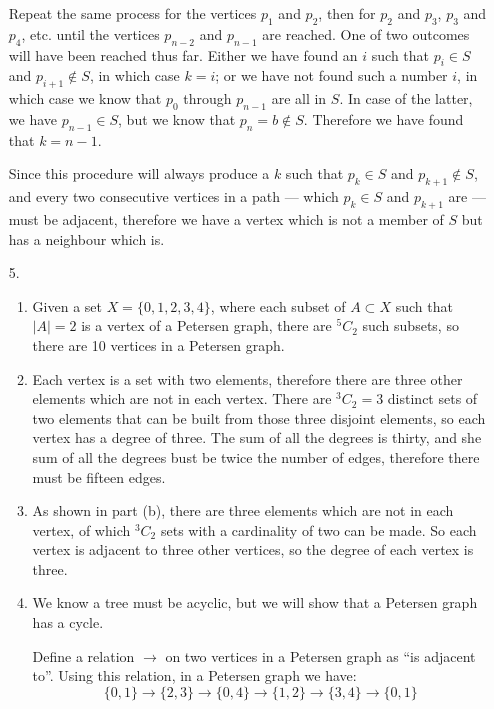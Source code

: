 \documentclass[fleqn]{article}
\newcommand*{\comb}[2]{{}^{#1}C_{#2}}
\begin{document}
\begin{enumerate}
	Repeat the same process for the vertices \(p_1\) and \(p_2\), then for \(p_2\) and \(p_3\), \(p_3\) and \(p_4\), etc. until the vertices \(p_{n-2}\) and \(p_{n-1}\) are reached. One of two outcomes will have been reached thus far. Either we have found an \(i\) such that \(p_i \in S\) and \(p_{i+1} \notin S\), in which case \(k = i\); or we have not found such a number \(i\), in which case we know that \(p_0\) through \(p_{n-1}\) are all in \(S\). In case of the latter, we have \(p_{n-1} \in S\), but we know that \(p_n = b \notin S\). Therefore we have found that \(k = n - 1\).

	Since this procedure will always produce a \(k\) such that \(p_k \in S\) and \(p_{k+1} \notin S\), and every two consecutive vertices in a path --- which \(p_k \in S\) and \(p_{k+1}\) are --- must be adjacent, therefore we have a vertex which is not a member of \(S\) but has a neighbour which is.

	\bigskip
	\item[5.]
	\begin{enumerate}
		\item %
		Given a set \(X = \{0, 1, 2, 3, 4\}\), where each subset of \(A \subset X\) such that \(|A| = 2\) is a vertex of a Petersen graph, there are \(\comb{5}{2}\) such subsets, so there are 10 vertices in a Petersen graph.

		\item %
		Each vertex is a set with two elements, therefore there are three other elements which are not in each vertex. There are \(\comb{3}{2} = 3\) distinct sets of two elements that can be built from those three disjoint elements, so each vertex has a degree of three. The sum of all the degrees is thirty, and she sum of all the degrees bust be twice the number of edges, therefore there must be fifteen edges.

		\item %
		As shown in part (b), there are three elements which are not in each vertex, of which \(\comb{3}{2}\) sets with a cardinality of two can be made. So each vertex is adjacent to three other vertices, so the degree of each vertex is three.

		\item %
		We know a tree must be acyclic, but we will show that a Petersen graph has a cycle.
		
		Define a relation \(\to\) on two vertices in a Petersen graph as ``is adjacent to''. Using this relation, in a Petersen graph we have:
		\[\{0, 1\} \to \{2, 3\} \to \{0, 4\} \to \{1, 2\} \to \{3, 4\} \to \{0, 1\}\]


\end{enumerate}
\end{enumerate}
\end{document}
